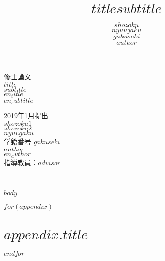 \documentclass[a4paper,10.5pt]{jsreport}
\title{ \Large $title$\newline{\ddash}$subtitle${\ddash}}
\author{$shozoku$\\$nyuugaku$\\$gakuseki$\\$author$}
\date{}
\begin{document}
\begin{titlepage}

\begin{center}
\vspace*{100truept}
{\Large 修士論文}\\
\vspace{50truept}
{\huge $title$}\\ %
\vspace{10truept}
{\huge $subtitle$}\\ %
\vspace{10truept}
{\large $en_title$}\\ %
{\large $en_subtitle$}\\
\vspace{60truept}

{\Large 2019年1月提出}\\ %
\vspace{10truept}
{\Large $shozoku1$}\\
{\Large $shozoku2$}\\
\vspace{20truept}
{\Large $nyuugaku$}\\ %
\vspace{20truept}
{\Large 学籍番号 $gakuseki$}\\
\vspace{20truept}
{\Large $author$}\\ %
{\Large $en_author$}\\ %

\vspace{20truept}
{\large
指導教員：$advisor$\\
}
\end{center}

\end{titlepage}
\newpage
\thispagestyle{empty}
　
\newpage
\setcounter{page}{1}
\tableofcontents

$body$

\printbibliography[title = 参考文献]



\appendix

$for(appendix)$
\chapter{$appendix.title$}

$endfor$
\end{document}
